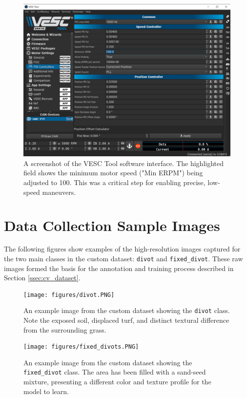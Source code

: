 \begin{figure}[h!]
    \centering
    \includegraphics[width=0.9\linewidth]{figures/vesctool.PNG}
    \caption{A screenshot of the VESC Tool software interface. The highlighted field shows the minimum motor speed ("Min ERPM") being adjusted to 100. This was a critical step for enabling precise, low-speed maneuvers.}
    \label{fig:appendix_vesc_tool}
\end{figure}

\cleardoublepage %

\section{Data Collection Sample Images}
\label{sec:appendix_dataset_samples}
The following figures show examples of the high-resolution images captured for the two main classes in the custom dataset: \texttt{divot} and \texttt{fixed\_divot}. These raw images formed the basis for the annotation and training process described in Section \ref{ssec:cv_dataset}.

\begin{figure}[h!]
    \centering
    \texttt{[image: figures/divot.PNG]}
    \caption{An example image from the custom dataset showing the \texttt{divot} class. Note the exposed soil, displaced turf, and distinct textural difference from the surrounding grass.}
    \label{fig:appendix_divot_sample}
\end{figure}

\begin{figure}[h!]
    \centering
    \texttt{[image: figures/fixed\_divots.PNG]}
    \caption{An example image from the custom dataset showing the \texttt{fixed\_divot} class. The area has been filled with a sand-seed mixture, presenting a different color and texture profile for the model to learn.}
    \label{fig:appendix_fixed_divot_sample}
\end{figure}

